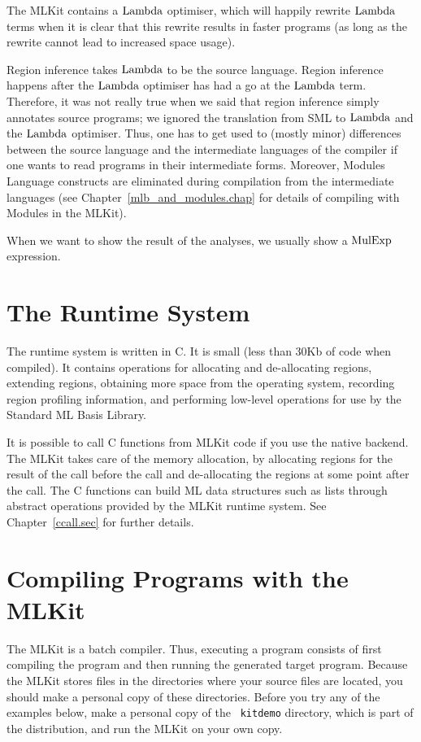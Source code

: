 \documentclass[12pt]{book}
\begin{document}
The MLKit contains a
%
$\hbox{\rm Lambda}$ optimiser, which will happily rewrite $\hbox{\rm Lambda}$ terms when it is
clear that this rewrite results in faster programs (as long as the
rewrite cannot lead to increased space usage).

Region inference takes $\hbox{\rm Lambda}$ to be the source language. Region
inference happens after the $\hbox{\rm Lambda}$ optimiser has had a go at the
$\hbox{\rm Lambda}$ term.  Therefore, it was not really true when we said that
region inference simply annotates source programs; we ignored the
translation from SML to $\hbox{\rm Lambda}$ and the $\hbox{\rm Lambda}$ optimiser. Thus, one has
to get used to (mostly minor) differences between the source language
and the intermediate languages of the compiler if one wants to read
programs in their intermediate forms. Moreover, 
% 
Modules Language constructs are eliminated during compilation from the
intermediate languages (see Chapter~\ref{mlb_and_modules.chap}
for details of compiling with Modules in the MLKit).

When we want to show the result of the analyses, we usually show a
$\hbox{\rm MulExp}$ expression.

\section{The Runtime System}
The 
%
runtime system is written in C. It is small (less than 30Kb of code
when compiled).  It contains operations for allocating and
de-allocating regions, extending regions, obtaining more space from
the operating system, recording region profiling information, and
performing low-level operations for use by the Standard ML Basis
Library.

It is possible to call 
%
C functions from MLKit code if you use the native backend.  The MLKit
takes care of the memory allocation, by allocating regions for the
result of the call before the call and de-allocating the regions at
some point after the call.  The C functions can build ML data
structures such as lists through abstract operations provided by the
MLKit runtime system. See Chapter~\ref{ccall.sec} for further details.

\section{Compiling Programs with the MLKit}
\label{tryit.sec}

The MLKit is a 
%
batch compiler. Thus, executing a program consists of first compiling
the program and then running the generated target program. Because the
MLKit stores files in the directories where your source files are
located, you should make a personal copy of these directories.  Before
you try any of the examples below, make a personal copy of the {\tt
  kitdemo} directory, which is part of the distribution, and run the
MLKit on your own copy.
\end{document}
